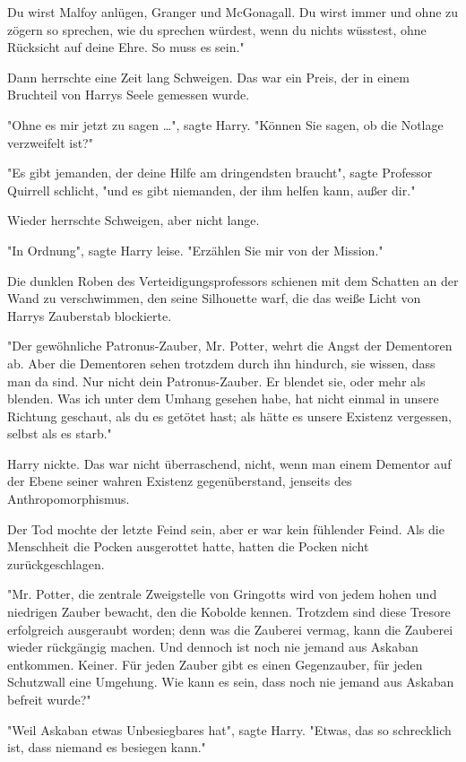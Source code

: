 {Du wirst Malfoy anlügen, Granger und McGonagall. Du wirst immer und ohne zu zögern so sprechen, wie du sprechen würdest, wenn du nichts wüsstest, ohne Rücksicht auf deine Ehre. So muss es sein."

Dann herrschte eine Zeit lang Schweigen. Das war ein Preis, der in einem Bruchteil von Harrys Seele gemessen wurde.

"Ohne es mir jetzt zu sagen …", sagte Harry. "Können Sie sagen, ob die Notlage verzweifelt ist?"

"Es gibt jemanden, der deine Hilfe am dringendsten braucht", sagte Professor Quirrell schlicht, "und es gibt niemanden, der ihm helfen kann, außer dir."

Wieder herrschte Schweigen, aber nicht lange.

"In Ordnung", sagte Harry leise. "Erzählen Sie mir von der Mission."

Die dunklen Roben des Verteidigungsprofessors schienen mit dem Schatten an der Wand zu verschwimmen, den seine Silhouette warf, die das weiße Licht von Harrys Zauberstab blockierte.

"Der gewöhnliche Patronus-Zauber, Mr. Potter, wehrt die Angst der Dementoren ab. Aber die Dementoren sehen trotzdem durch ihn hindurch, sie wissen, dass man da sind. Nur nicht dein Patronus-Zauber. Er blendet sie, oder mehr als blenden. Was ich unter dem Umhang gesehen habe, hat nicht einmal in unsere Richtung geschaut, als du es getötet hast; als hätte es unsere Existenz vergessen, selbst als es starb."

Harry nickte. Das war nicht überraschend, nicht, wenn man einem Dementor auf der Ebene seiner wahren Existenz gegenüberstand, jenseits des Anthropomorphismus.

Der Tod mochte der letzte Feind sein, aber er war kein fühlender Feind. Als die Menschheit die Pocken ausgerottet hatte, hatten die Pocken nicht zurückgeschlagen.

"Mr. Potter, die zentrale Zweigstelle von Gringotts wird von jedem hohen und niedrigen Zauber bewacht, den die Kobolde kennen. Trotzdem sind diese Tresore erfolgreich ausgeraubt worden; denn was die Zauberei vermag, kann die Zauberei wieder rückgängig machen. Und dennoch ist noch nie jemand aus Askaban entkommen. Keiner. Für jeden Zauber gibt es einen Gegenzauber, für jeden Schutzwall eine Umgehung. Wie kann es sein, dass noch nie jemand aus Askaban befreit wurde?"

"Weil Askaban etwas Unbesiegbares hat", sagte Harry. "Etwas, das so schrecklich ist, dass niemand es besiegen kann."

}
